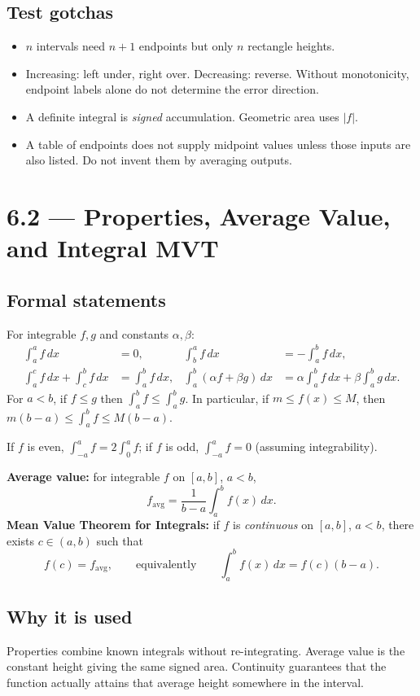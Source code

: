 \documentclass[11pt]{article}
\newcommand{\topic}[2]{\clearpage\section*{#1 --- #2}}
\newcommand{\dx}{\,dx}
\begin{document}
\subsection*{Test gotchas}
\begin{itemize}
\item $n$ intervals need $n+1$ endpoints but only $n$ rectangle heights.
\item Increasing: left under, right over. Decreasing: reverse. Without monotonicity, endpoint labels alone do not determine the error direction.
\item A definite integral is \emph{signed} accumulation. Geometric area uses $|f|$.
\item A table of endpoints does not supply midpoint values unless those inputs are also listed. Do not invent them by averaging outputs.
\end{itemize}

\topic{6.2}{Properties, Average Value, and Integral MVT}
\subsection*{Formal statements}
For integrable $f,g$ and constants $\alpha,\beta$:
\begin{align*}
\int_a^a f\dx&=0,& \int_b^a f\dx&=-\int_a^b f\dx,\\
\int_a^c f\dx+\int_c^b f\dx&=\int_a^b f\dx,&
\int_a^b(\alpha f+\beta g)\dx&=\alpha\int_a^b f\dx+\beta\int_a^b g\dx.
\end{align*}
For $a<b$, if $f\le g$ then $\int_a^b f\le\int_a^b g$. In particular,
if $m\le f(x)\le M$, then $m(b-a)\le\int_a^b f\le M(b-a)$.

If $f$ is even, $\int_{-a}^a f=2\int_0^a f$; if $f$ is odd, $\int_{-a}^a f=0$ (assuming integrability).

\textbf{Average value:} for integrable $f$ on $[a,b]$, $a<b$,
\[
f_{\mathrm{avg}}=\frac{1}{b-a}\int_a^b f(x)\dx.
\]
\textbf{Mean Value Theorem for Integrals:} if $f$ is \emph{continuous} on $[a,b]$, $a<b$, there exists $c\in(a,b)$ such that
\[
f(c)=f_{\mathrm{avg}},\qquad\text{equivalently}\qquad
\int_a^b f(x)\dx=f(c)(b-a).
\]
\subsection*{Why it is used}
Properties combine known integrals without re-integrating. Average value is the constant height giving the same signed area. Continuity guarantees that the function actually attains that average height somewhere in the interval.
\end{document}
